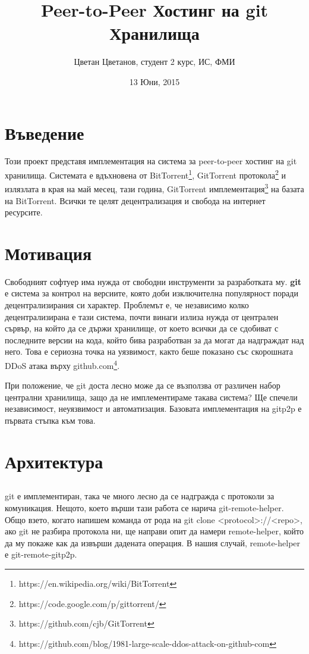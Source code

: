 \documentclass[a4paper,12pt]{article}
\title{Peer-to-Peer Хостинг на git Хранилища}
\date{13 Юни, 2015}
\author{Цветан Цветанов, студент 2 курс, ИС, ФМИ}
\begin{document}
\maketitle

\section{Въведение}

Този проект представя имплементация на система за peer-to-peer хостинг на git
хранилища. Системата е вдъхновена от 
BitTorrent\footnote{https://en.wikipedia.org/wiki/BitTorrent}, 
GitTorrent протокола\footnote{https://code.google.com/p/gittorrent/} и 
излязлата в края на май месец, тази година, 
GitTorrent имплементация\footnote{https://github.com/cjb/GitTorrent} на базата
на BitTorrent. Всички те целят децентрализация и свобода на интернет ресурсите.

\section{Мотивация}

Свободният софтуер има нужда от свободни инструменти за разработката му. \textbf{git} е
система за контрол на версиите, която доби изключителна популярност поради
децентрализирания си характер. Проблемът е, че независимо колко децентрализирана
е тази система, почти винаги излиза нужда от централен сървър, на който да се 
държи хранилище, от което всички да се сдобиват с последните версии на кода,
който бива разработван за да могат да надграждат над него. Това е сериозна точка
на уязвимост, както беше показано със скорошната DDoS атака
върху github.com\footnote{https://github.com/blog/1981-large-scale-ddos-attack-on-github-com}.

При положение, че git доста лесно може да се възползва от различен набор централни
хранилища, защо да не имплементираме такава система? Ще спечели независимост,
неуязвимост и автоматизация. Базовата имплементация на gitp2p е първата стъпка
към това.

\section{Архитектура}

\subsection{}

git е имплементиран, така че много лесно да се надгражда с протоколи за 
комуникация. Нещото, което върши тази работа се нарича git-remote-helper. Общо
взето, когато напишем команда от рода на git clone <protocol>://<repo>, ако
git не разбира протокола ни, ще направи опит да намери remote-helper, който да
му покаже как да извърши дадената операция. В нашия случай, remote-helper е
git-remote-gitp2p.
\end{document}
